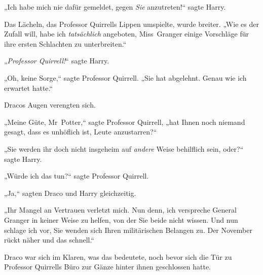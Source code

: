 „Ich habe mich nie dafür gemeldet, gegen \emph{Sie} anzutreten!“ sagte Harry.

Das Lächeln, das Professor Quirrells Lippen umspielte, wurde breiter. „Wie es der Zufall will, habe ich \emph{tatsächlich} angeboten, Miss~Granger einige Vorschläge für ihre ersten Schlachten zu unterbreiten.“

„\emph{Professor Quirrell!}“ sagte Harry.

„Oh, keine Sorge,“ sagte Professor Quirrell. „Sie hat abgelehnt. Genau wie ich erwartet hatte.“

Dracos Augen verengten sich.

„Meine Güte, Mr~Potter,“ sagte Professor Quirrell, „hat Ihnen noch niemand gesagt, dass es unhöflich ist, Leute anzustarren?“

„Sie werden ihr doch nicht insgeheim auf \emph{andere} Weise behilflich sein, oder?“ sagte Harry.

„Würde ich das tun?“ sagte Professor Quirrell.

„Ja,“ sagten Draco und Harry gleichzeitig.

„Ihr Mangel an Vertrauen verletzt mich. Nun denn, ich verspreche General Granger in keiner Weise zu helfen, von der Sie beide nicht wissen. Und nun schlage ich vor, Sie wenden sich Ihren militärischen Belangen zu. Der November rückt näher und das schnell.“

\later

Draco war sich im Klaren, was das bedeutete, noch bevor sich die Tür zu Professor Quirrells Büro zur Gänze hinter ihnen geschlossen hatte.

